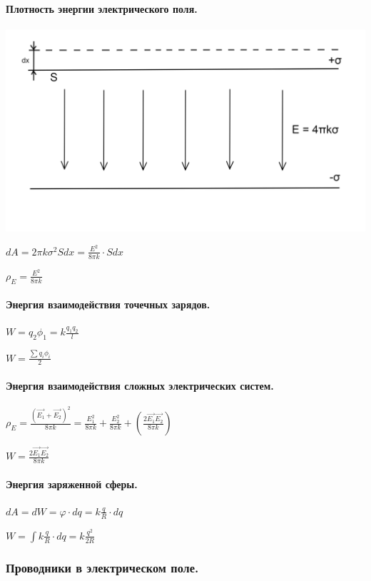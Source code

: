 \documentclass{article}
\begin{document}
            \paragraph{Плотность энергии электрического поля.}
                \includegraphics[scale=0.15]{1_1_13_2-1.png}    

                \(dA = 2\pi k \sigma^2 S dx = \frac{E^2}{8\pi k} \cdot S dx\)

                \(\rho_E = \frac{E^2}{8\pi k}\)
            \paragraph{Энергия взаимодействия точечных зарядов.}
                \(W = q_2\phi_1 = k\frac{q_1q_2}{l}\)

                \(W = \frac{\sum{q_i\phi_i}}{2}\)
            \paragraph{Энергия взаимодействия сложных электрических систем.}
                \(\rho_E = \frac{(\vec{E_1} + \vec{E_2})^2}{8\pi k} = \frac{E_1^2}{8\pi k} + \frac{E_2^2}{8\pi k} + (\frac{2\vec{E_1}\vec{E_2}}{8\pi k})\)

                \(W = \frac{2\vec{E_1}\vec{E_2}}{8\pi k}\)
            \paragraph{Энергия заряженной сферы.}
                \(dA = dW = \varphi \cdot dq = k\frac{q}{R}\cdot dq\)

                \(W = \int{k\frac{q}{R}\cdot dq} = k\frac{q^2}{2R}\)
        \subsubsection{Проводники в электрическом поле.}
\end{document}
